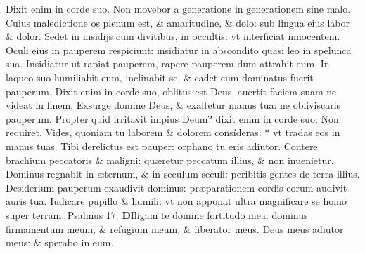\documentclass[a5paper,10pt]{book}
\def\ae{æ}
\begin{document}
\begin{multicols*}{2}
\newline \color{red} D\color{black}ixit enim in corde suo. Non movebor a generatione in generationem sine malo.
\newline \color{red} C\color{black}uius maledictione os plenum est, \& amaritudine, \& dolo: sub lingua eius labor \& dolor.
\newline \color{red} S\color{black}edet in insidijs cum divitibus, in occultis: vt interficiat innocentem.
\newline \color{red} O\color{black}culi eius in pauperem respiciunt: insidiatur in abscondito quasi leo in spelunca sua.
\newline \color{red} I\color{black}nsidiatur ut rapiat pauperem, rapere pauperem dum attrahit eum.
\newline \color{red} I\color{black}n laqueo suo humiliabit eum, inclinabit se, \& cadet cum dominatus fuerit pauperum.
\newline \color{red} D\color{black}ixit enim in corde suo, oblitus est Deus, auertit faciem suam ne videat in finem.
\newline \color{red} E\color{black}xsurge domine Deus, \& exaltetur manus tua: ne obliviscaris pauperum.
\newline \color{red} P\color{black}ropter quid irritavit impius Deum? dixit enim in corde suo: Non requiret.
\newline \color{red} V\color{black}ides, quoniam tu laborem \& dolorem consíderas: * vt tradas eos in manus tuas.
\newline \color{red} T\color{black}ibi derelictus est pauper: orphano tu eris adiutor.
\newline \color{red} C\color{black}ontere brachium peccatoris \& maligni: qu\ae retur peccatum illius, \& non inuenietur.
\newline \color{red} D\color{black}ominus regnabit in \ae ternum, \& in seculum seculi: peribitis gentes de terra illius.
\newline \color{red} D\color{black}esiderium pauperum exaudivit dominus: pr\ae parationem cordis eorum audivit auris tua.
\newline \color{red} I\color{black}udicare pupillo \& humili: vt non apponat ultra magnificare se homo super terram. \quad \color{red} Psalmus 17. \color{black}
\vspace{-1em}
\lettrine[lines=2]{\bfseries \color{red} D}{}Iligam te domine fortitudo mea: dominus firmamentum meum, \& refugium meum, \& liberator meus.
\newline \color{red} D\color{black}eus meus adiutor meus: \& sperabo in eum.

\end{multicols*}
\end{document}
